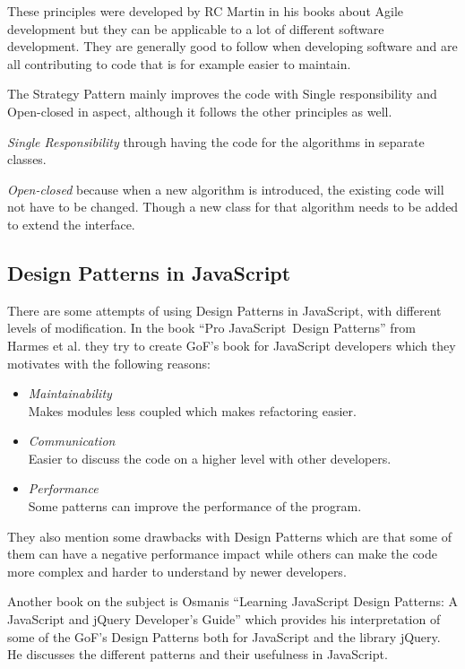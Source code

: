 \documentclass[conference, a4paper]{IEEEtran}
\begin{document}
These principles were developed by RC Martin in his books about Agile development but they can be applicable to a lot of different software development. They are generally good to follow when developing software and are all contributing to code that is for example easier to maintain.~\cite{bibitem:Bob}

The Strategy Pattern mainly improves the code with Single responsibility and Open-closed in aspect, although it follows the other principles as well.

\textit{Single Responsibility} through having the code for the algorithms in separate classes.

\textit{Open-closed} because when a new algorithm is introduced, the existing code will not have to be changed. Though a new class for that algorithm needs to be added to extend the interface.

\subsection{Design Patterns in JavaScript}
There are some attempts of using Design Patterns in JavaScript, with different levels of modification. In the book ``Pro JavaScript\texttrademark~Design Patterns'' from Harmes et al. they try to create GoF's book for JavaScript developers which they motivates with the following reasons:
\begin{itemize}
    \item \emph{Maintainability} \\
		Makes modules less coupled which makes refactoring easier.
    \item \emph{Communication} \\
		Easier to discuss the code on a higher level with other developers.
    \item \emph{Performance} \\
    Some patterns can improve the performance of the program.
\end{itemize}
They also mention some drawbacks with Design Patterns which are that some of them can have a negative performance impact while others can make the code more complex and harder to understand by newer developers.~\cite{bibitem:DiazHarmes}

Another book on the subject is Osmanis ``Learning JavaScript Design Patterns: A JavaScript and jQuery Developer's Guide'' which provides his interpretation of some of the GoF's Design Patterns both for JavaScript and the library jQuery. He discusses the different patterns and their usefulness in JavaScript.~\cite{bibitem:Osmani}
\end{document}
